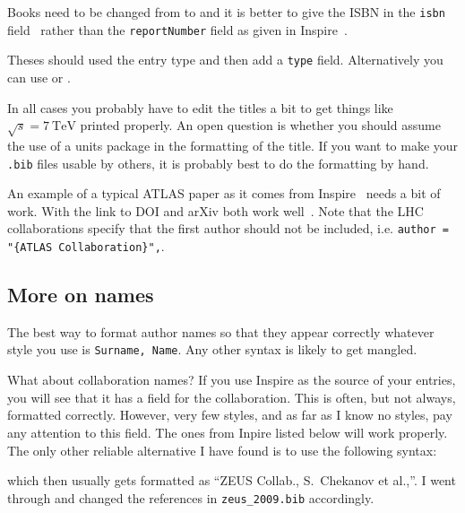 Books need to be changed from  to
 and it is better to give the ISBN in the \texttt{isbn}
field~\cite{Halzen:1984mc-final} rather than the \texttt{reportNumber}
field as given in Inspire~\cite{Halzen:1984mc-inspire}.

Theses should used the  entry type and
then add a \texttt{type} field. Alternatively you can use
 or .

In all cases you probably have to edit the titles a bit to get
things like \(\sqrt{s} = \SI{7}{\TeV}\) printed properly. An open
question is whether you should assume the use of a units package in
the formatting of the title. If you want to make your \texttt{.bib}
files usable by others, it is probably best to do the formatting by
hand.

An example of a typical ATLAS paper as it comes from
Inspire~\cite{Aad:2010ey-inspire} needs a bit of work.  With  the link to DOI and arXiv both work well~\cite{Aad:2010ey-final}.
Note that the LHC collaborations specify that the first author should not
be included, i.e. \verb|author = "{ATLAS Collaboration}",|.




\subsection{More on names}%
\label{sec:ref:names}

The best way to format author names so that they appear correctly
whatever \BibTeX{} style you use is \texttt{Surname, Name}. Any other
syntax is likely to get mangled.

What about collaboration names? If you use Inspire as the source of
your \BibTeX{} entries, you will see that it has a field for the
collaboration. This is often, but not always, formatted
correctly. 
However, very few \BibTeX{} styles, and as far as I know no  styles, 
pay any attention to this field.
The ones from Inpire listed below will work properly. The
only other reliable alternative I have found is to use the following
syntax:
\begin{tcblisting}{listing only}
@Article{Chekanov:2009qja,
     author    = "{ZEUS Collab.} and Chekanov, S. and others",
\end{tcblisting}
which then usually gets formatted as \enquote{ZEUS Collab., S.\ Chekanov et
al.,}.
I went through and changed the references in \texttt{zeus\_2009.bib}
accordingly.


